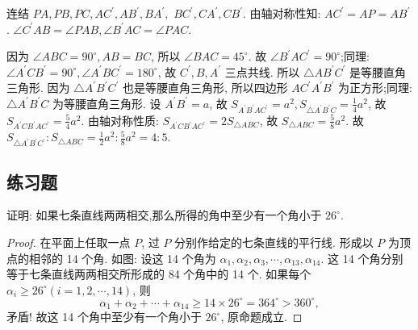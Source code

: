 \documentclass{March}
\begin{document}
\begin{solution}
	连结 $P A,  P B,  P C,  A C^{\prime},  A B^{\prime},  B A^{\prime}, $ $B C^{\prime},  C A^{\prime},  C B^{\prime}$.
	由轴对称性知: $A C^{\prime}=A P=A B^{\prime}$.
	$\angle C^{\prime} A B=\angle P A B, \angle B^{\prime} A C=\angle P A C$.

	因为 $\angle A B C=90^{\circ}, A B=B C$, 所以 $\angle B A C=45^{\circ}$. 故 $\angle B^{\prime} A C^{\prime}=90^{\circ}$;同理: $\angle A^{\prime} C B^{\prime}=90^{\circ}, \angle A^{\prime} B C^{\prime}=180^{\circ}$, 故 $C^{\prime},  B,  A^{\prime}$ 三点共线.
	所以 $\triangle A B^{\prime} C^{\prime}$ 是等腰直角三角形.
	因为 $\triangle A^{\prime} B^{\prime} C^{\prime}$ 也是等腰直角三角形, 所以四边形 $A C^{\prime} A^{\prime} B^{\prime}$ 为正方形;同理: $\triangle A^{\prime} B^{\prime} C$ 为等腰直角三角形.
	设 $A^{\prime} B^{\prime}=a$, 故 $S_{A^{\prime} B^{\prime} A C^{\prime}}=a^2, S_{\triangle A^{\prime} B^{\prime} C}=\frac{1}{4} a^2$, 故 $S_{A^{\prime} C B^{\prime} A C^{\prime}}=\frac{5}{4} a^2$.
	由轴对称性质: $S_{A^{\prime} C B^{\prime} A C^{\prime}}=2 S_{\triangle A B C}$, 故 $S_{\triangle A B C}=\frac{5}{8} a^2$.
	故 $S_{\triangle A^{\prime} B^{\prime} C^{\prime}}: S_{\triangle A B C}=\frac{1}{2} a^2: \frac{5}{8} a^2=4: 5$.
\end{solution}

\subsection{练习题}
\begin{exercise}
	证明: 如果七条直线两两相交,那么所得的角中至少有一个角小于 $26^{\circ}$.
\end{exercise}
\begin{proof}
	在平面上任取一点 $P$, 过 $P$ 分别作给定的七条直线的平行线. 形成以 $P$ 为顶点的相邻的 14 个角. 如图: 设这 14 个角为 $\alpha_1, \alpha_2, \alpha_3, \cdots, \alpha_{13}, \alpha_{14}$. 这 14 个角分别等于七条直线两两相交所形成的 84 个角中的 14 个.
	如果每个 $\alpha_i \geqslant 26^{\circ}(i=1,2, \cdots, 14)$, 则
	$$
		\alpha_1+\alpha_2+\cdots+\alpha_{14} \geqslant 14 \times 26^{\circ}=364^{\circ}>360^{\circ},
	$$
	矛盾!
	故这 14 个角中至少有一个角小于 $26^{\circ}$, 原命题成立.
\end{proof}
\end{document}
